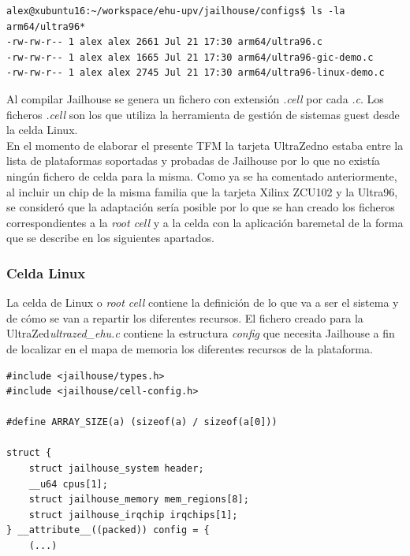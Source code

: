 \begin{lstlisting}[style=CStyle]
alex@xubuntu16:~/workspace/ehu-upv/jailhouse/configs$ ls -la arm64/ultra96*
-rw-rw-r-- 1 alex alex 2661 Jul 21 17:30 arm64/ultra96.c
-rw-rw-r-- 1 alex alex 1665 Jul 21 17:30 arm64/ultra96-gic-demo.c
-rw-rw-r-- 1 alex alex 2745 Jul 21 17:30 arm64/ultra96-linux-demo.c
\end{lstlisting}

Al compilar Jailhouse se genera un fichero con extensión \textit{.cell} por cada \textit{.c}. Los ficheros \textit{.cell} son los que utiliza la herramienta de gestión de sistemas guest desde la celda Linux.\\
En el momento de elaborar el presente TFM la tarjeta UltraZed\texttrademark no estaba entre la lista de plataformas soportadas y probadas de Jailhouse por lo que no existía ningún fichero de celda para la misma. Como ya se ha comentado anteriormente, al incluir un chip de la misma familia que la tarjeta Xilinx ZCU102 y la Ultra96, se consideró que la adaptación sería posible por lo que se han creado los ficheros correspondientes a la \textit{root cell} y a la celda con la aplicación baremetal de la forma que se describe en los siguientes apartados.

\subsubsection{Celda Linux}

La celda de Linux o \textit{root cell} contiene la definición de lo que va a ser el sistema y de cómo se van a repartir los diferentes recursos. El fichero creado para la UltraZed\texttrademark \textit{ultrazed\_ehu.c} contiene la estructura \textit{config} que necesita Jailhouse a fin de localizar en el mapa de memoria los diferentes recursos de la plataforma.
\begin{lstlisting}[style=CStyle]
#include <jailhouse/types.h>
#include <jailhouse/cell-config.h>

#define ARRAY_SIZE(a) (sizeof(a) / sizeof(a[0]))

struct {
	struct jailhouse_system header;
	__u64 cpus[1];
	struct jailhouse_memory mem_regions[8];
	struct jailhouse_irqchip irqchips[1];
} __attribute__((packed)) config = {
	(...)
\end{lstlisting}

